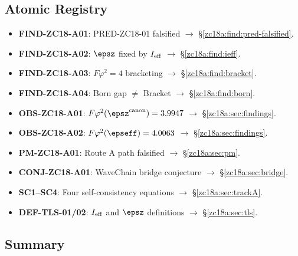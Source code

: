 \documentclass[12pt, a4paper]{article}
\begin{document}
\subsection{Atomic Registry}
\label{zc18a:sec:registry}

\begin{formalbox}[title={Atomic Units Introduced by ZC18 Track~A (10 new units)}]
\begin{itemize}[leftmargin=*, noitemsep]
  \item \textbf{FIND-ZC18-A01}: PRED-ZC18-01 falsified
    $\to$ \S\ref{zc18a:find:pred-falsified}.
  \item \textbf{FIND-ZC18-A02}: $\epsz$ fixed by $I_{\rm eff}$
    $\to$ \S\ref{zc18a:find:ieff}.
  \item \textbf{FIND-ZC18-A03}: $F\varphi^2=4$ bracketing
    $\to$ \S\ref{zc18a:find:bracket}.
  \item \textbf{FIND-ZC18-A04}: Born gap $\neq$ Bracket
    $\to$ \S\ref{zc18a:find:born}.
  \item \textbf{OBS-ZC18-A01}: $F\varphi^2(\epsz^{\rm canon})=3.9947$
    $\to$ \S\ref{zc18a:sec:findings}.
  \item \textbf{OBS-ZC18-A02}: $F\varphi^2(\epseff)=4.0063$
    $\to$ \S\ref{zc18a:sec:findings}.
  \item \textbf{PM-ZC18-A01}: Route A path falsified
    $\to$ \S\ref{zc18a:sec:pm}.
  \item \textbf{CONJ-ZC18-A01}: WaveChain bridge conjecture
    $\to$ \S\ref{zc18a:sec:bridge}.
  \item \textbf{SC1--SC4}: Four self-consistency equations
    $\to$ \S\ref{zc18a:sec:trackA}.
  \item \textbf{DEF-TLS-01/02}: $I_{\rm eff}$ and $\epsz$ definitions
    $\to$ \S\ref{zc18a:sec:tls}.
\end{itemize}
\end{formalbox}

\subsection{Summary}
\label{zc18a:sec:summary}
\end{document}
